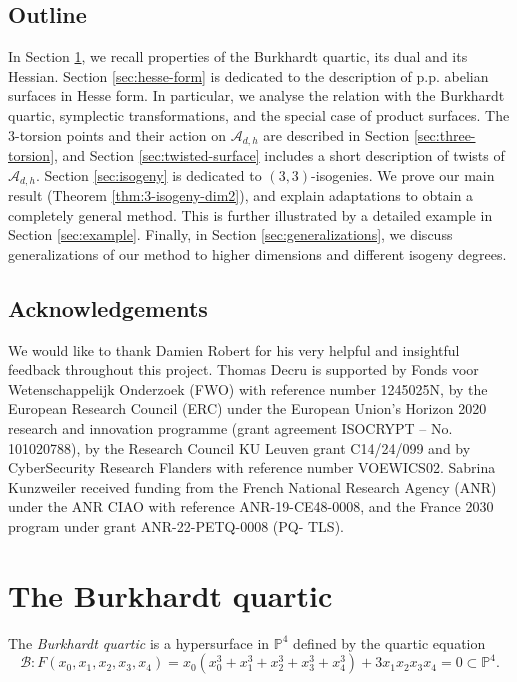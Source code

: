 \documentclass[11pt]{amsart}
\theoremstyle{definition}
\newcommand{\B}{\mathcal{B}}
\newcommand{\A}{\mathcal{A}}
\newcommand{\PP}{\mathbb{P}}
\begin{document}
\subsection{Outline}
In Section \ref{sec:burkhardt}, we recall properties of the Burkhardt quartic, its dual and its Hessian. Section \ref{sec:hesse-form} is dedicated to the description of p.p. abelian surfaces in Hesse form. In particular, we analyse the relation with the Burkhardt quartic, symplectic transformations, and the special case of product surfaces.  The $3$-torsion points and their action on $\A_{d,h}$ are described in Section \ref{sec:three-torsion}, and Section \ref{sec:twisted-surface} includes a short description of twists of $\A_{d,h}$. Section \ref{sec:isogeny} is dedicated to $(3,3)$-isogenies.  We prove our main result (Theorem \ref{thm:3-isogeny-dim2}), and explain adaptations to obtain a completely general method. This is further illustrated by a detailed example in Section \ref{sec:example}. Finally, in Section \ref{sec:generalizations}, we discuss generalizations of our method to higher dimensions and different isogeny degrees.

\subsection{Acknowledgements}

We would like to thank Damien Robert for his very helpful and insightful feedback throughout this project. Thomas Decru is supported by Fonds voor Wetenschappelijk Onderzoek (FWO) with reference number 1245025N, by the European Research Council (ERC) under the European Union’s Horizon 2020 research and innovation programme (grant agreement ISOCRYPT – No. 101020788), by the Research Council KU Leuven grant C14/24/099 and by CyberSecurity Research Flanders with reference number VOEWICS02. Sabrina Kunzweiler received funding from the French National Research Agency (ANR) under the ANR CIAO with reference ANR-19-CE48-0008, and the France 2030 program under grant ANR-22-PETQ-0008 (PQ-
TLS).
\section{The Burkhardt quartic} \label{sec:burkhardt}

The {\em Burkhardt quartic} is a hypersurface in $\PP^4$ defined by the quartic equation
\begin{equation}
	\B: F(x_0,x_1,x_2,x_3,x_4) = x_0(x_0^3 + x_1^3 + x_2^3 + x_3^3 + x_4^3) + 3 x_1x_2x_3x_4 = 0 \subset \PP^4. \label{eq:burkhardt-quartic}
\end{equation}
\end{document}

